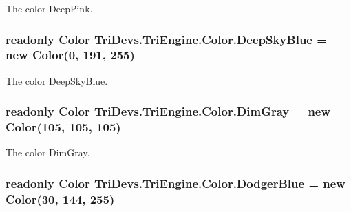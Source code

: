 The color Deep\-Pink. 

\hypertarget{struct_tri_devs_1_1_tri_engine_1_1_color_a0e4663f60368cb26c632299d5ec16dde}{
\subsubsection[{Deep\-Sky\-Blue}]{\setlength{\rightskip}{0pt plus 5cm}readonly {\bf Color} Tri\-Devs.\-Tri\-Engine.\-Color.\-Deep\-Sky\-Blue = new {\bf Color}(0, 191, 255)\hspace{0.3cm}{\ttfamily [static]}}}\label{struct_tri_devs_1_1_tri_engine_1_1_color_a0e4663f60368cb26c632299d5ec16dde}


The color Deep\-Sky\-Blue. 

\hypertarget{struct_tri_devs_1_1_tri_engine_1_1_color_a0dce529b66a749a1be6694eda81fad20}{
\subsubsection[{Dim\-Gray}]{\setlength{\rightskip}{0pt plus 5cm}readonly {\bf Color} Tri\-Devs.\-Tri\-Engine.\-Color.\-Dim\-Gray = new {\bf Color}(105, 105, 105)\hspace{0.3cm}{\ttfamily [static]}}}\label{struct_tri_devs_1_1_tri_engine_1_1_color_a0dce529b66a749a1be6694eda81fad20}


The color Dim\-Gray. 

\hypertarget{struct_tri_devs_1_1_tri_engine_1_1_color_a10cc4fe3f0f5e1c27cc2a1f0aa8cf940}{
\subsubsection[{Dodger\-Blue}]{\setlength{\rightskip}{0pt plus 5cm}readonly {\bf Color} Tri\-Devs.\-Tri\-Engine.\-Color.\-Dodger\-Blue = new {\bf Color}(30, 144, 255)\hspace{0.3cm}{\ttfamily [static]}}}\label{struct_tri_devs_1_1_tri_engine_1_1_color_a10cc4fe3f0f5e1c27cc2a1f0aa8cf940}


